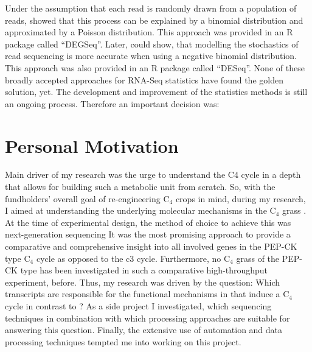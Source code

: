 Under the assumption that each read is randomly drawn from a population of reads, \cite{someone_1970} showed that this process can be explained by a binomial distribution and approximated by a Poisson distribution.
This approach was provided in an R package called "`DEGSeq"'.
Later, \cite{someoneelse_1972} could show, that modelling the stochastics of read sequencing is more accurate when using a negative binomial distribution. 
This approach was also provided in an R package called "`DESeq"'.
None of these broadly accepted approaches for RNA-Seq statistics have found the golden solution, yet.
The development and improvement of the statistics methods is still an ongoing process.
Therefore an important decision was:

\section{Personal Motivation}
Main driver of my research was the urge to understand the C4 cycle in a depth that allows for building such a metabolic unit from scratch.
So, with the fundholders' overall goal of re-engineering C$_4$ crops in mind, during my research, I aimed at understanding the underlying molecular mechanisms in the C$_4$ grass .
At the time of experimental design, the method of choice to achieve this was next-generation sequencing
It was the most promising approach to provide a comparative and comprehensive insight into all involved genes in the \ac{PEP-CK} type C$_4$ cycle as opposed to the c3 cycle.
Furthermore, no C$_4$ grass of the \ac{PEP-CK} type has been investigated in such a comparative high-throughput experiment, before.
Thus, my research was driven by the question: Which transcripts are responsible for the functional mechanisms in  that induce a C$_4$ cycle in contrast to ?
As a side project I investigated, which sequencing techniques in combination with which processing approaches are suitable for answering this question.
Finally, the extensive use of automation and data processing techniques tempted me into working on this project. %

